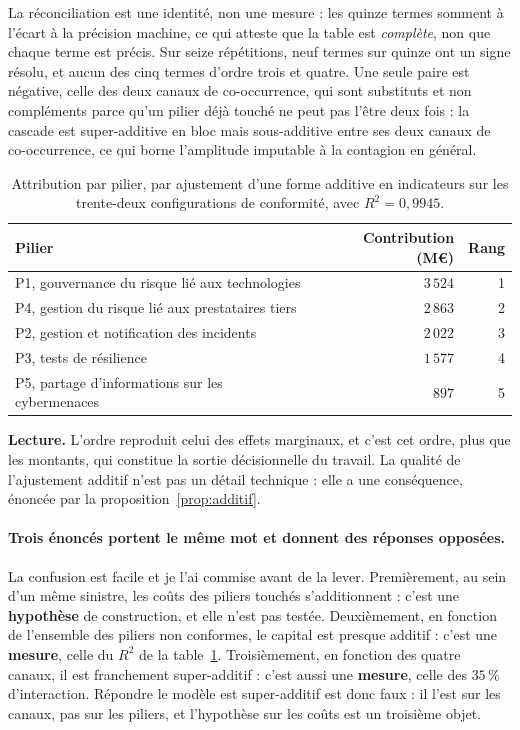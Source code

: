 \documentclass[12pt,a4paper]{article}
\theoremstyle{definition}
\begin{document}
La réconciliation est une identité, non une mesure : les quinze termes somment à
l'écart à la précision machine, ce qui atteste que la table est \emph{complète},
non que chaque terme est précis. Sur seize répétitions, neuf termes sur quinze ont
un signe résolu, et aucun des cinq termes d'ordre trois et quatre. Une seule paire
est négative, celle des deux canaux de co-occurrence, qui sont substituts et non
compléments parce qu'un pilier déjà touché ne peut pas l'être deux fois : la
cascade est super-additive en bloc mais sous-additive entre ses deux canaux de
co-occurrence, ce qui borne l'amplitude imputable à la contagion en général.

\begin{table}[htbp]
\centering\small
\renewcommand{\arraystretch}{1.2}
\begin{tabular}{@{}>{\raggedright\arraybackslash}p{7.2cm}rr@{}}
\toprule
\textbf{Pilier} & \textbf{Contribution (M\euro)} & \textbf{Rang} \\
\midrule
P1, gouvernance du risque lié aux technologies & $3\,524$ & 1 \\
P4, gestion du risque lié aux prestataires tiers & $2\,863$ & 2 \\
P2, gestion et notification des incidents & $2\,022$ & 3 \\
P3, tests de résilience & $1\,577$ & 4 \\
P5, partage d'informations sur les cybermenaces & $897$ & 5 \\
\bottomrule
\end{tabular}
\caption{Attribution par pilier, par ajustement d'une forme additive en
indicateurs sur les trente-deux configurations de conformité, avec
$R^2 = 0{,}9945$.}
\label{tab:piliers}
\end{table}

\textbf{Lecture.} L'ordre reproduit celui des effets marginaux, et c'est cet
ordre, plus que les montants, qui constitue la sortie décisionnelle du travail. La
qualité de l'ajustement additif n'est pas un détail technique : elle a une
conséquence, énoncée par la proposition~\ref{prop:additif}.

\paragraph{Trois énoncés portent le même mot et donnent des réponses opposées.} La
confusion est facile et je l'ai commise avant de la lever. Premièrement, au sein
d'un même sinistre, les coûts des piliers touchés s'additionnent : c'est une
\textbf{hypothèse} de construction, et elle n'est pas testée. Deuxièmement, en
fonction de l'ensemble des piliers non conformes, le capital est presque additif :
c'est une \textbf{mesure}, celle du $R^2$ de la table~\ref{tab:piliers}.
Troisièmement, en fonction des quatre canaux, il est franchement super-additif :
c'est aussi une \textbf{mesure}, celle des $35\,\%$ d'interaction. Répondre
\og{}le modèle est super-additif\fg{} est donc faux : il l'est sur les canaux, pas
sur les piliers, et l'hypothèse sur les coûts est un troisième objet.
\end{document}
